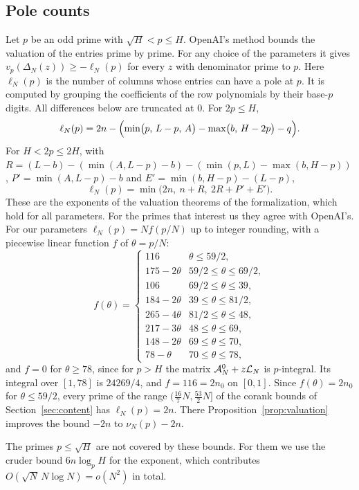 \subsection{Pole counts}
Let $p$ be an odd prime with $\sqrt H<p\le H$. OpenAI's method \cite[\S3]{OpenAI2026} bounds the valuation
of the entries prime by prime. For any choice of the parameters it gives $v_p(\Delta_N(z))\ge-\ell_N(p)$
for every $z$ with denominator prime to $p$. Here $\ell_N(p)$ is the number of columns whose entries can
have a pole at $p$. It is computed by grouping the coefficients of the row polynomials by their base-$p$
digits. All differences below are truncated at $0$. For $2p\le H$,
\[
 \ell_N(p)=2n-\Bigl(\min\bigl(p,\,L-p,\,A\bigr)-\max\bigl(b,\,H-2p\bigr)-q\Bigr).
\]
For $H<2p\le2H$, with $R=(L-b)-(\min(A,L-p)-b)-(\min(p,L)-\max(b,H-p))$, $P'=\min(A,L-p)-b$ and
$E'=\min(b,H-p)-(L-p)$,
\[
 \ell_N(p)=\min\bigl(2n,\ n+R,\ 2R+P'+E'\bigr).
\]
These are the exponents of the valuation theorems of the formalization, which hold for all parameters. For
the primes that interest us they agree with OpenAI's. For our parameters $\ell_N(p)=Nf(p/N)$ up to integer
rounding, with a piecewise linear function $f$ of $\theta=p/N$:
\[
 f(\theta)=\begin{cases}
 116&\theta\le59/2,\\
 175-2\theta&59/2\le \theta\le69/2,\\
 106&69/2\le \theta\le39,\\
 184-2\theta&39\le \theta\le81/2,\\
 265-4\theta&81/2\le \theta\le48,\\
 217-3\theta&48\le \theta\le69,\\
 148-2\theta&69\le \theta\le70,\\
 78-\theta&70\le \theta\le78,
 \end{cases}
\]
and $f=0$ for $\theta\ge78$, since for $p>H$ the matrix $\mathcal A^0_N+z\mathcal L_N$ is $p$-integral. Its integral over
$[1,78]$ is $24269/4$, and $f=116=2n_0$ on $[0,1]$. Since $f(\theta)=2n_0$ for $\theta\le59/2$, every prime of
the range $(\frac{16}7N,\frac{53}2N]$ of the corank bounds of Section~\ref{sec:content} has
$\ell_N(p)=2n$. There Proposition~\ref{prop:valuation} improves the bound $-2n$ to $\nu_N(p)-2n$.

The primes $p\le\sqrt H$ are not covered by these bounds. For them we use the cruder bound $6n\log_pH$ for
the exponent, which contributes $O(\sqrt N\,N\log N)=o(N^2)$ in total.

